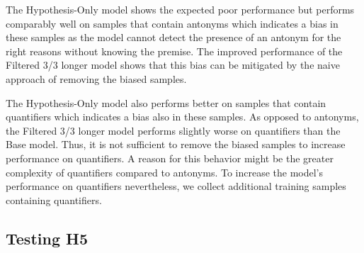 The Hypothesis-Only model shows the expected poor performance but performs comparably well on samples that contain antonyms which indicates a bias in these samples as the model cannot detect the presence of an antonym for the right reasons without knowing the premise. The improved performance of the Filtered 3/3 longer model shows that this bias can be mitigated by the naive approach of removing the biased samples.

The Hypothesis-Only model also performs better on samples that contain quantifiers which indicates a bias also in these samples. As opposed to antonyms, the Filtered 3/3 longer model performs slightly worse on quantifiers than the Base model. Thus, it is not sufficient to remove the biased samples to increase performance on quantifiers. A reason for this behavior might be the greater complexity of quantifiers compared to antonyms. To increase the model's performance on quantifiers nevertheless, we collect additional training samples containing quantifiers.

\subsection{Testing H5}
